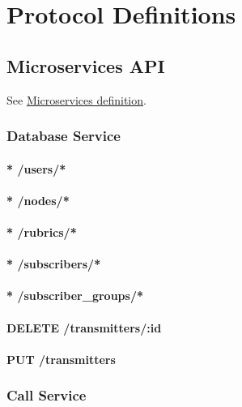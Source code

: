 \chapter{Protocol Definitions}

\section{Microservices API}
\label{protocoldef:microservicesapi}
See \hyperref[internalprog:microservices]{Microservices definition}.

\subsection{Database Service}
\subsubsection{* /users/*}

\subsubsection{* /nodes/*}

\subsubsection{* /rubrics/*}

\subsubsection{* /subscribers/*}

\subsubsection{* /subscriber\_groups/*}

\subsubsection{DELETE /transmitters/:id}

\subsubsection{PUT /transmitters}


\subsection{Call Service}

